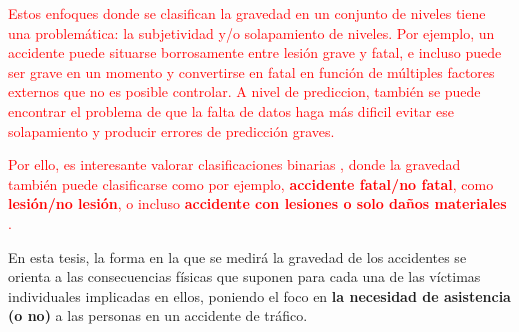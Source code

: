 \documentclass{uathesis-es}
\begin{document}
\textcolor{red}{Estos enfoques donde se clasifican la gravedad en un conjunto de niveles tiene una problemática: la subjetividad y/o solapamiento de niveles. Por ejemplo, un accidente puede situarse borrosamente entre lesión grave y fatal, e incluso puede ser grave en un momento y convertirse en fatal en función de múltiples factores externos que no es posible controlar. A nivel de prediccion, también se puede encontrar el problema de que la falta de datos haga más dificil evitar ese solapamiento y producir errores de predicción graves.}

\textcolor{red}{Por ello, es interesante valorar clasificaciones binarias \cite{prati2017using, hosseinzadeh2021investigating}, donde la gravedad también puede clasificarse como por ejemplo, \textbf{accidente fatal/no fatal}, como \textbf{lesión/no lesión}, o incluso \textbf{accidente con lesiones o solo daños materiales }\cite{zhang2022hybrid, ma2021analytic}.}



En esta tesis, la forma en la que se medirá la gravedad de los accidentes se orienta a las consecuencias físicas que suponen para cada una de las víctimas individuales implicadas en ellos, poniendo el foco en \textbf{la necesidad de asistencia (o no)} a las personas en un accidente de tráfico.



\end{document}
